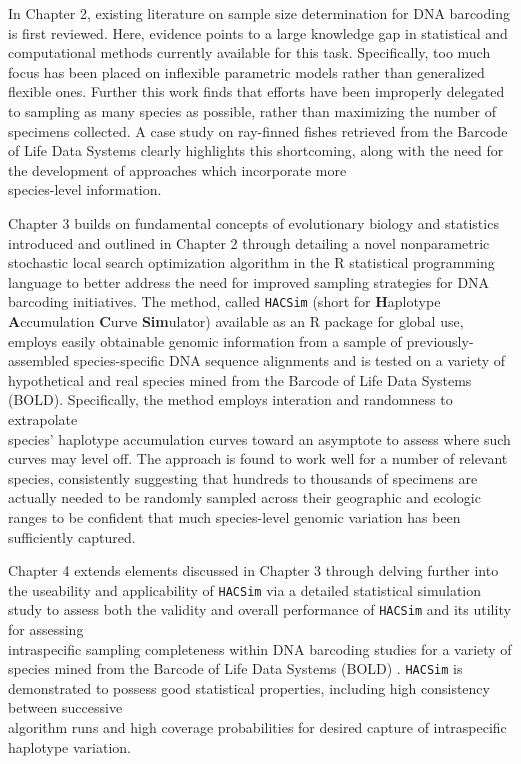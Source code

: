 \vspace{5mm}

In Chapter 2, existing literature on sample size determination for DNA barcoding is first reviewed. Here, evidence points to a large knowledge gap in statistical and computational methods currently available for this task. Specifically, too much focus has been placed on inflexible parametric models rather than generalized flexible ones. Further this work finds that efforts have been improperly delegated to sampling as many species as possible, rather than maximizing the number of specimens collected. A case study on ray-finned fishes retrieved from the Barcode of Life Data Systems \cite{ratnasingham2007bold} clearly highlights this shortcoming, along with the need for the development of approaches which incorporate more 
\\ species-level information. 

\vspace{5mm}

Chapter 3 builds on fundamental concepts of evolutionary biology and statistics \\ introduced and outlined in Chapter 2 through detailing a novel nonparametric stochastic local search optimization algorithm in the R statistical programming language to better address the need for improved sampling strategies for DNA barcoding initiatives. The method, called {\tt HACSim} (short for \textbf{H}aplotype \textbf{A}ccumulation \textbf{C}urve \textbf{Sim}ulator) available as an R package for global use, employs easily obtainable genomic information from a sample of previously-assembled species-specific DNA sequence alignments and is tested on a variety of hypothetical and real species mined from the Barcode of Life Data Systems (BOLD). Specifically, the method employs interation and randomness to extrapolate \\ species' haplotype accumulation curves toward an asymptote to assess where such curves may level off. The approach is found to work well for a number of relevant species, consistently suggesting that hundreds to thousands of specimens are actually needed to be randomly sampled across their geographic and ecologic ranges to be confident that much species-level genomic variation has been sufficiently captured.  


\vspace{5mm}

Chapter 4 extends elements discussed in Chapter 3 through delving further into the useability and applicability of {\tt HACSim} via a detailed statistical simulation study to assess both the validity and overall performance of {\tt HACSim} and its utility for assessing \\ intraspecific sampling completeness within DNA barcoding studies for a variety of species mined from the Barcode of Life Data Systems (BOLD) \cite{ratnasingham2007bold}. {\tt HACSim} is demonstrated to possess good statistical properties, including high consistency between successive 
\\ algorithm runs and high coverage probabilities for desired capture of intraspecific \\ haplotype variation.

